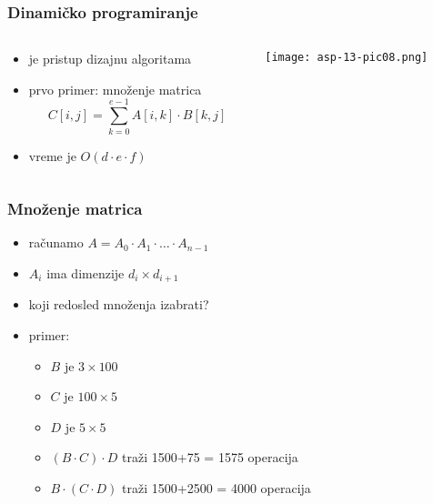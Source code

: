 \documentclass[compress,aspectratio=169]{beamer}
\begin{document}
\begin{frame}[fragile]
  \frametitle{Dinamičko programiranje}
  \begin{columns}
    \begin{column}[t]{6cm}
      \begin{itemize}
        \item {} je pristup dizajnu algoritama
        \item prvo primer: množenje matrica
        $$ C[i,j] = \sum_{k=0}^{e-1} A[i,k]\cdot B[k,j]$$
        \item vreme je $O(d\cdot e\cdot f)$
      \end{itemize}
    \end{column}
    \begin{column}[t]{6cm}
      \begin{center}
        \texttt{[image: asp-13-pic08.png]}
      \end{center}
    \end{column}
  \end{columns}
\end{frame}

\begin{frame}[fragile]
  \frametitle{Množenje matrica}
  \begin{itemize}
    \item računamo $A=A_0 \cdot A_{1}\cdot \ldots\cdot A_{n-1}$
    \item $A_{i}$ ima dimenzije $d_{i}\times d_{i+1}$
    \item koji redosled množenja izabrati?
    \item primer:
    \begin{itemize}
      \item $B$ je $3\times 100$
      \item $C$ je $100\times 5$
      \item $D$ je $5\times 5$
      \item $(B\cdot C)\cdot D$ traži 1500+75 = 1575 operacija
      \item $B\cdot (C\cdot D)$ traži 1500+2500 = 4000 operacija
    \end{itemize}
  \end{itemize}
\end{frame}
\end{document}
